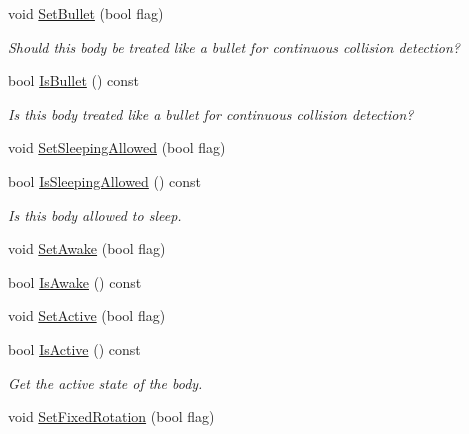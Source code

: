 \begin{DoxyCompactItemize}
\mbox{\label{classb2Body_a3253af3725b8d6d63d8223bcd2ddab5c}} 
void \hyperlink{classb2Body_a3253af3725b8d6d63d8223bcd2ddab5c}{Set\+Bullet} (bool flag)
\begin{DoxyCompactList}\small\item\em Should this body be treated like a bullet for continuous collision detection? \end{DoxyCompactList}\item 
\mbox{\label{classb2Body_ad99db1c7a19e8de333ff7f65b0b953f4}} 
bool \hyperlink{classb2Body_ad99db1c7a19e8de333ff7f65b0b953f4}{Is\+Bullet} () const
\begin{DoxyCompactList}\small\item\em Is this body treated like a bullet for continuous collision detection? \end{DoxyCompactList}\item 
void \hyperlink{classb2Body_a229a6de228416203fecbf7a7544c33bb}{Set\+Sleeping\+Allowed} (bool flag)
\item 
\mbox{\label{classb2Body_ac47251de3a8c0ccff620be7bd5ae696a}} 
bool \hyperlink{classb2Body_ac47251de3a8c0ccff620be7bd5ae696a}{Is\+Sleeping\+Allowed} () const
\begin{DoxyCompactList}\small\item\em Is this body allowed to sleep. \end{DoxyCompactList}\item 
void \hyperlink{classb2Body_ac72ed3df52a26c33db82252ab57399af}{Set\+Awake} (bool flag)
\item 
bool \hyperlink{classb2Body_a697f708427cdf7d31a626e80e694682c}{Is\+Awake} () const
\item 
void \hyperlink{classb2Body_ab8059b7b3e3b64aee17b54f68f7dde80}{Set\+Active} (bool flag)
\item 
\mbox{\label{classb2Body_a825f37f457d3674ace96e2b8a9b4cae6}} 
bool \hyperlink{classb2Body_a825f37f457d3674ace96e2b8a9b4cae6}{Is\+Active} () const
\begin{DoxyCompactList}\small\item\em Get the active state of the body. \end{DoxyCompactList}\item 
void \hyperlink{classb2Body_aff35078e2a221d2d05409674936cb8d2}{Set\+Fixed\+Rotation} (bool flag)
\item 

\end{DoxyCompactItemize}
